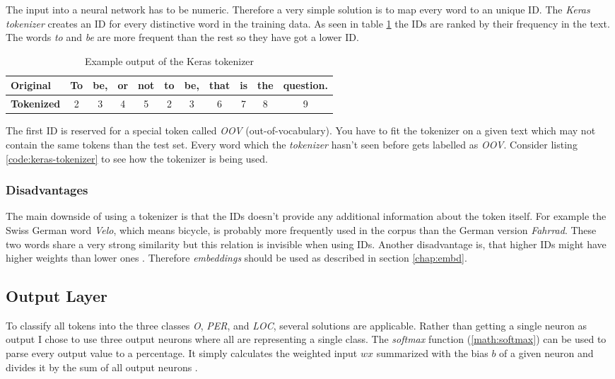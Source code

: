 The input into a neural network has to be numeric. Therefore a very simple solution is to map every word to an unique ID. The \emph{Keras tokenizer} creates an ID for every distinctive word in the training data. As seen in table \ref{tbl:keras-tokenizer} the IDs are ranked by their frequency in the text. The words \emph{to} and \emph{be} are more frequent than the rest so they have got a lower ID.

\begin{table}[ht!]
    \centering
    \begin{tabular}{|l|c|c|c|c|c|c|c|c|c|c|}
        \hline
        \textbf{Original} & To & be, & or & not & to & be, & that & is & the & question. \\
        \hline
        \textbf{Tokenized} & 2 & 3 & 4 & 5 & 2 & 3 & 6 & 7 & 8 & 9 \\
        \hline
    \end{tabular}
    \caption{Example output of the Keras tokenizer}
    \label{tbl:keras-tokenizer}
\end{table}

The first ID is reserved for a special token called \emph{OOV} (out-of-vocabulary). You have to fit the tokenizer on a given text which may not contain the same tokens than the test set. Every word which the \emph{tokenizer} hasn't seen before gets labelled as \emph{OOV}. Consider listing \ref{code:keras-tokenizer} to see how the tokenizer is being used.

\subsubsection{Disadvantages}

The main downside of using a tokenizer is that the IDs doesn't provide any additional information about the token itself. For example the Swiss German word \emph{Velo}, which means bicycle, is probably more frequently used in the corpus than the German version \emph{Fahrrad}. These two words share a very strong similarity but this relation is invisible when using IDs. Another disadvantage is, that higher IDs might have higher weights than lower ones \cite{nurz18}. Therefore \emph{embeddings} should be used as described in section \ref{chap:embd}.

\subsection{Output Layer}

To classify all tokens into the three classes \emph{O}, \emph{PER}, and \emph{LOC}, several solutions are applicable. Rather than getting a single neuron as output I chose to use three output neurons where all are representing a single class. The \emph{softmax} function (\ref{math:softmax}) can be used to parse every output value to a percentage. It simply calculates the weighted input $wx$ summarized with the bias $b$ of a given neuron and divides it by the sum of all output neurons \cite{soft}.


